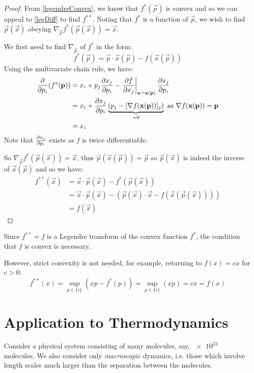 \documentclass[../main.tex]{subfiles}
\begin{document}
\begin{proof}
  From \cref{legendreConvex}, we know that $f^{*}(\vec{p})$ is convex and so we can appeal to \cref{legDiff} to find $f^{**}$.
  Noting that $f^{*}$ is a function of $\vec{p}$, we wish to find $\vec{p}(\vec{x})$ obeying $\nabla_{\vec{p}} f^{*}(\vec{p}(\vec{x})) = \vec{x}$.

  We first need to find $\nabla_{\vec{p}}$ of $f^{*}$ in the form:
  \[
    f^{*}(\vec{p}) = \vec{p} \cdot \vec{x}(\vec{p}) - f(\vec{x}(\vec{p}))
  \]
  Using the multivariate chain rule, we have:
  \begin{align*}
    \pderiv{}{p_i}(f^{*}(\vec{p})) &= x_i + p_j \pderiv{x_j}{p_i} - \at{\pderiv{f}{x_j}}{\vec{x} = \vec{x}(\vec{p})} \pderiv{x_j}{p_i} \\
                                   &= x_i + \pderiv{x_j}{p_i} \underbrace{\left(p_j - [\nabla f(\vec{x}(\vec{p}))]_j\right)}_{=0} \text{ as $\nabla f(\vec{x}(\vec{p})) = \vec{p}$} \\
                                   &= x_i
  \end{align*}
  Note that $\pderiv{x_j}{p_i}$ exists as $f$ is twice differentiable.

  So $\nabla_{\vec{p}} f^{*}(\vec{p}(\vec{x})) = \vec{x}$, thus $\vec{p}(\vec{x}(\vec{p})) = \vec{p}$ so $\vec{p}(\vec{x})$ is indeed the inverse of $\vec{x}(\vec{p})$ and so we have:
  \begin{align*}
    f^{**}(\vec{x}) &= \vec{x} \cdot \vec{p}(\vec{x}) - f^{*}(\vec{p}(\vec{x})) \\
                    &= \vec{x} \cdot \vec{p}(\vec{x}) - (\vec{p}(\vec{x}) \cdot \vec{x} - f(\vec{x}(\vec{p}(\vec{x})))) \\
                    &= f(\vec{x})
  \end{align*}
\end{proof}
\begin{remark}
  Since $f^{**} = f$ is a Legendre transform of the convex function $f^{*}$, the condition that $f$ is convex is necessary.

  However, strict convexity is not needed, for example, returning to $f(x) = cx$ for $c > 0$:
  \[
    f^{**}(x) = \sup_{p \in \{c\}} (xp - f^{*}(p)) = \sup_{p \in \{c\}} (xp) = cx = f(x)
  \]
\end{remark}
\section{Application to Thermodynamics}
Consider a physical system consisting of many molecules, say, $\qty{e23}{}$ molecules.
We also consider only \textit{macroscopic} dynamics, i.e. those which involve length scales much larger than the separation between the molecules.
\end{document}
